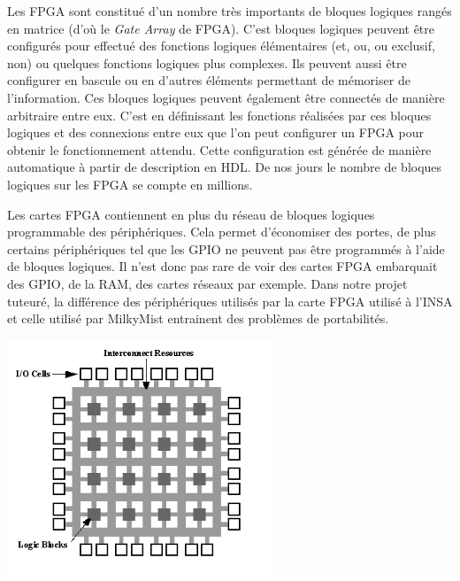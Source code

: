 Les FPGA sont constitué d'un nombre très importants de bloques logiques rangés en
matrice (d'où le \textit{Gate Array} de FPGA). C'est bloques logiques peuvent être
configurés pour effectué des fonctions logiques élémentaires (et, ou, ou exclusif,
non) ou quelques fonctions logiques plus complexes. Ils peuvent aussi être configurer
en bascule ou en d'autres éléments permettant de mémoriser de l'information. Ces
bloques logiques peuvent également être connectés de manière arbitraire entre eux.
C'est en définissant les fonctions réalisées par ces bloques logiques et des
connexions entre eux que l'on peut configurer un FPGA pour obtenir le fonctionnement
attendu. Cette configuration est générée de manière automatique à partir de
description en HDL. De nos jours le nombre de bloques logiques sur les FPGA se compte
en millions. 

Les cartes FPGA contiennent en plus du réseau de bloques logiques programmable des
périphériques. Cela permet d'économiser des portes, de plus certains périphériques
tel que les GPIO ne peuvent pas être programmés à l'aide de bloques logiques. Il
n'est donc pas rare de voir des cartes FPGA embarquait des GPIO, de la RAM, des
cartes réseaux par exemple. Dans notre projet tuteuré, la différence des
périphériques utilisés par la carte FPGA utilisé à l'INSA et celle utilisé par
MilkyMist entrainent des problèmes de portabilités.

\includegraphics[width=8cm]{porte.png}

